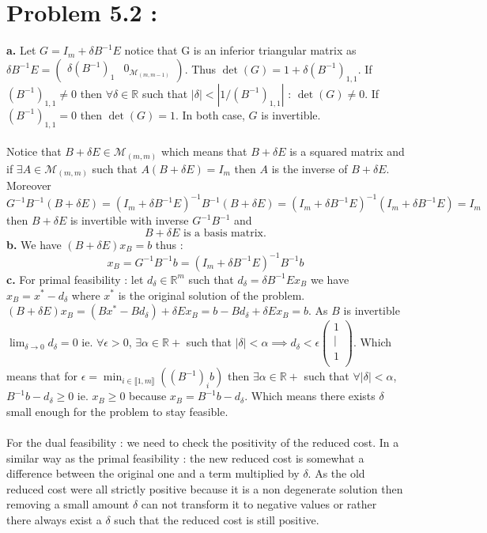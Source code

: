 \documentclass{article}
\begin{document}
\section*{Problem 5.2 :}
\textbf{a.} Let $G = I_m+\delta B^{-1}E$  notice that G is an inferior triangular matrix as 
$\delta B^{-1}E = \left(\begin{array}{cc}
    \delta (B^{-1})_1 & 0_{\mathcal{M}_{(m,m-1)}}
\end{array}\right)$. Thus $\det(G) = 1+\delta (B^{-1})_{1,1}$. If $(B^{-1})_{1,1}\neq 0$ then $\forall \delta \in \mathbb{R}$ such that $|\delta|<|1/(B^{-1})_{1,1}|$ : $\det(G)\neq 0$.
If $(B^{-1})_{1,1} = 0$ then $\det(G) = 1$. In both case, $G$ is invertible.
\\\\
Notice that $B+\delta E \in \mathcal{M}_{(m,m)}$ which means that $B+\delta E$ is a squared matrix and if $\exists A\in\mathcal{M}_{(m,m)}$ such that $A(B+\delta E)=I_m$ then $A$ is the inverse of $B+\delta E$.\\
Moreover $G^{-1}B^{-1}(B+\delta E) = (I_m+\delta B^{-1}E)^{-1}B^{-1}(B+\delta E) = (I_m+\delta B^{-1}E)^{-1}(I_m+\delta B^{-1}E) = I_m$ then $B+\delta E$ is invertible with inverse $G^{-1}B^{-1}$ and 
$$\boxed{B+\delta E\text{ is a basis matrix.}}$$
\textbf{b.} We have $(B+\delta E)x_B = b$ thus : $$\boxed{x_B = G^{-1}B^{-1}b = (I_m+\delta B^{-1}E)^{-1}B^{-1}b}$$
\textbf{c.} For primal feasibility : let $d_\delta \in\mathbb{R}^m$ such that $d_\delta = \delta B^{-1}Ex_B$ we have $x_B = x^*-d_{\delta}$ where $x^*$ is the original solution of the problem. $(B+\delta E)x_B = (Bx^*-Bd_\delta) +\delta Ex_B = b- Bd_\delta+\delta E x_B = b$. As $B$ is invertible $\lim_{\delta\to0}d_\delta = 0$ ie. $\forall \epsilon>0$, $\exists\alpha\in\mathbb{R}+$ such that $|\delta|<\alpha \implies d_\delta<\epsilon\left(\begin{array}{c}
    1\\
    |\\
    1\\
\end{array}\right)$.
Which means that for $\epsilon = \min_{i\in\llbracket 1,m \rrbracket}((B^{-1})_ib)$ then $\exists \alpha\in\mathbb{R}+$ such that $\forall |\delta| <\alpha$, $B^{-1}b-d_\delta\ge0$ ie. $x_B\ge 0$ because $x_B = B^{-1}b-d_\delta$. Which means there exists $ \delta $ small enough for the problem to stay feasible.
\\\\
For the dual feasibility : we need to check the positivity of the reduced cost. In a similar way as the primal feasibility : the new reduced cost is somewhat a difference between the original one and a term multiplied by $\delta$. As the old reduced cost were all strictly positive because it is a non degenerate solution then removing a small amount $\delta$ can not transform it to negative values or rather there always exist a $\delta$ such that the reduced cost is still positive.
\end{document}
